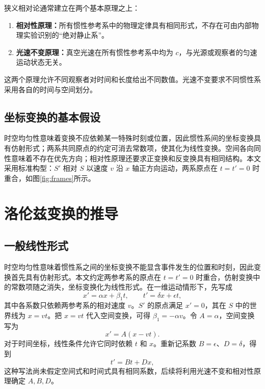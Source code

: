 \documentclass[style=classic,color=full]{lc-article}
\begin{document}
狭义相对论通常建立在两个基本原理之上：
\begin{enumerate}
  \item \textbf{相对性原理：}所有惯性参考系中的物理定律具有相同形式，不存在可由内部物理实验识别的“绝对静止系”。
  \item \textbf{光速不变原理：}真空光速在所有惯性参考系中均为 $c$，与光源或观察者的匀速运动状态无关。
\end{enumerate}

这两个原理允许不同观察者对时间和长度给出不同数值。光速不变要求不同惯性系采用各自的时间与空间划分。

\subsection{坐标变换的基本假设}

时空均匀性意味着变换不应依赖某一特殊时刻或位置，因此惯性系间的坐标变换具有仿射形式；两系共同原点的约定可消去常数项，使其化为线性变换。空间各向同性意味着不存在优先方向；相对性原理还要求正变换和反变换具有相同结构。本文采用标准构型：$S'$ 相对 $S$ 以速度 $v$ 沿 $x$ 轴正方向运动，两系原点在 $t=t'=0$ 时重合，如图\ref{fig:frames}所示。


\section{洛伦兹变换的推导}

\subsection{一般线性形式}

时空均匀性意味着惯性系之间的坐标变换不能显含事件发生的位置和时刻，因此变换首先具有仿射形式。本文约定两参考系的原点在 $t=t'=0$ 时重合，仿射变换中的常数项随之消失，坐标变换化为线性形式。在一维运动情形下，先写成
\begin{equation*}
  x'=\alpha x+\beta_1t,
  \qquad
  t'=\delta x+\epsilon t,
\end{equation*}
其中各系数只依赖两参考系的相对速度 $v$。$S'$ 的原点满足 $x'=0$，其在 $S$ 中的世界线为 $x=vt$。把 $x=vt$ 代入空间变换，可得 $\beta_1=-\alpha v$。令 $A=\alpha$，空间变换写为
\begin{equation}
  x'=A(x-vt).
  \label{eq:xgeneral}
\end{equation}
对于时间坐标，线性条件允许它同时依赖 $t$ 和 $x$。重新记系数 $B=\epsilon$、$D=\delta$，得到
\begin{equation}
  t'=Bt+Dx,
  \label{eq:tgeneral}
\end{equation}
这种写法尚未假定空间式和时间式具有相同系数，后续将利用光速不变和相对性原理确定 $A,B,D$。
\end{document}
